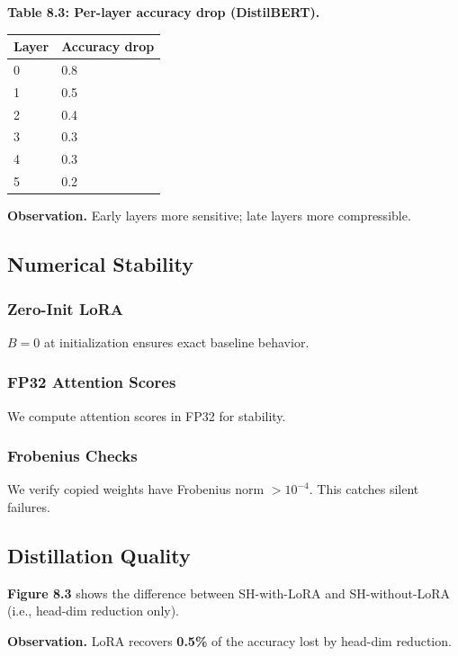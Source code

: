 \textbf{Table 8.3: Per-layer accuracy drop (DistilBERT).}

\begin{table}[H]
\centering
\small
\begin{tabular}{ll}
\toprule
\textbf{Layer} & \textbf{Accuracy drop} \\
\midrule
0 & 0.8 \\
1 & 0.5 \\
2 & 0.4 \\
3 & 0.3 \\
4 & 0.3 \\
5 & 0.2 \\
\bottomrule
\end{tabular}
\end{table}

\textbf{Observation.} Early layers more sensitive; late layers more compressible.

\subsection{Numerical Stability}

\subsubsection{Zero-Init LoRA}

$B = 0$ at initialization ensures exact baseline behavior.

\subsubsection{FP32 Attention Scores}

We compute attention scores in FP32 for stability.

\subsubsection{Frobenius Checks}

We verify copied weights have Frobenius norm $> 10^{-4}$. This catches 
silent failures.

\subsection{Distillation Quality}

\textbf{Figure 8.3} shows the difference between SH-with-LoRA and SH-without-LoRA 
(i.e., head-dim reduction only).

\textbf{Observation.} LoRA recovers \textbf{0.5\%} of the accuracy lost by 
head-dim reduction.

